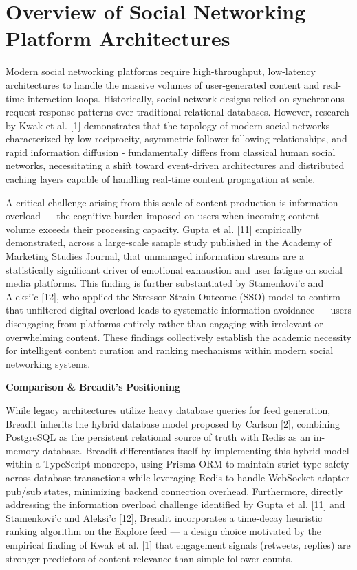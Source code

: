 
\section{Overview of Social Networking Platform Architectures}

Modern social networking platforms require high-throughput, low-latency architectures to handle the massive volumes of user-generated content and real-time interaction loops. Historically, social network designs relied on synchronous request-response patterns over traditional relational databases. However, research by Kwak et al. [1] demonstrates that the topology of modern social networks - characterized by low reciprocity, asymmetric follower-following relationships, and rapid information diffusion - fundamentally differs from classical human social networks, necessitating a shift toward event-driven architectures and distributed caching layers capable of handling real-time content propagation at scale.

A critical challenge arising from this scale of content production is information overload --- the cognitive burden imposed on users when incoming content volume exceeds their processing capacity. Gupta et al. [11] empirically demonstrated, across a large-scale sample study published in the Academy of Marketing Studies Journal, that unmanaged information streams are a statistically significant driver of emotional exhaustion and user fatigue on social media platforms. This finding is further substantiated by Stamenkovi{'c} and Aleksi{'c} [12], who applied the Stressor-Strain-Outcome (SSO) model to confirm that unfiltered digital overload leads to systematic information avoidance --- users disengaging from platforms entirely rather than engaging with irrelevant or overwhelming content. These findings collectively establish the academic necessity for intelligent content curation and ranking mechanisms within modern social networking systems.

\textbf{Comparison \& }\textbf{Breadit's}\textbf{ Positioning}

While legacy architectures utilize heavy database queries for feed generation, Breadit inherits the hybrid database model proposed by Carlson [2], combining PostgreSQL as the persistent relational source of truth with Redis as an in-memory database. Breadit differentiates itself by implementing this hybrid model within a TypeScript monorepo, using Prisma ORM to maintain strict type safety across database transactions while leveraging Redis to handle WebSocket adapter pub/sub states, minimizing backend connection overhead. Furthermore, directly addressing the information overload challenge identified by Gupta et al. [11] and Stamenkovi{'c} and Aleksi{'c} [12], Breadit incorporates a time-decay heuristic ranking algorithm on the Explore feed --- a design choice motivated by the empirical finding of Kwak et al. [1] that engagement signals (retweets, replies) are stronger predictors of content relevance than simple follower counts.

